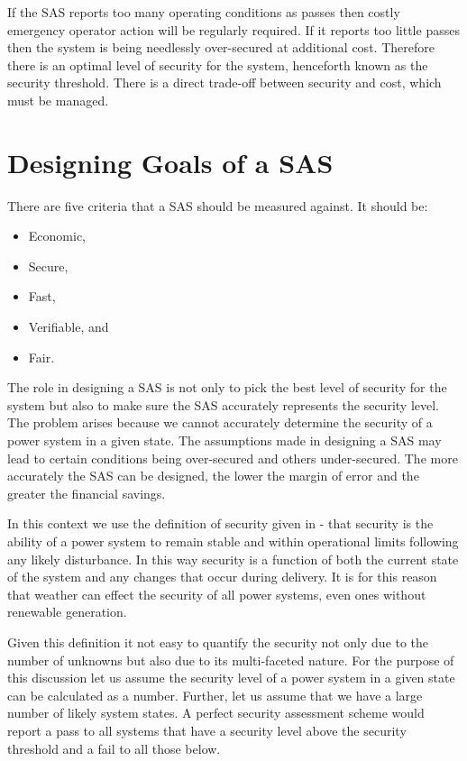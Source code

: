 \documentclass[a4paper,oneside,12pt]{report}
\begin{document}
If the SAS reports too many operating conditions as passes then costly emergency operator action will be regularly required. If it reports too little passes then the system is being needlessly over-secured at additional cost. Therefore there is an optimal level of security for the system, henceforth known as the security threshold. There is a direct trade-off between security and cost, which must be managed.

\section{Designing Goals of a SAS}\label{lbl_sec_design_goals}

There are five criteria that a SAS should be measured against. It should be:

\begin{itemize}
  \item Economic,
  \item Secure,
  \item Fast,
  \item Verifiable, and
  \item Fair.
\end{itemize}

The role in designing a SAS is not only to pick the best level of security for the system but also to make sure the SAS accurately represents the security level. The problem arises because we cannot accurately determine the security of a power system in a given state. The assumptions made in designing a SAS may lead to certain conditions being over-secured and others under-secured. The more accurately the SAS can be designed, the lower the margin of error and the greater the financial savings.

In this context we use the definition of security given in \cite{Kundur2004} - that security is the ability of a power system to remain stable and within operational limits following any likely disturbance. In this way security is a function of both the current state of the system and any changes that occur during delivery. It is for this reason that weather can effect the security of all power systems, even ones without renewable generation.

Given this definition it not easy to quantify the security not only due to the number of unknowns but also due to its multi-faceted nature. For the purpose of this discussion let us assume the security level of a power system in a given state can be calculated as a number. Further, let us assume that we have a large number of likely system states. A perfect security assessment scheme would report a pass to all systems that have a security level above the security threshold and a fail to all those below.
\end{document}
